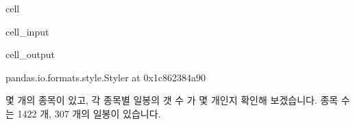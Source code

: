 \documentclass[letterpaper,10pt,english]{jupyterBook}
\begin{document}
\begin{sphinxuseclass}{cell}\begin{sphinxVerbatimInput}

\begin{sphinxuseclass}{cell_input}
\begin{sphinxVerbatim}[commandchars=\\\{\}]
  
\end{sphinxVerbatim}

\end{sphinxuseclass}\end{sphinxVerbatimInput}
\begin{sphinxVerbatimOutput}

\begin{sphinxuseclass}{cell_output}
\begin{sphinxVerbatim}[commandchars=\\\{\}]
\PYGZlt{}pandas.io.formats.style.Styler at 0x1c862384a90\PYGZgt{}
\end{sphinxVerbatim}

\end{sphinxuseclass}\end{sphinxVerbatimOutput}

\end{sphinxuseclass}
\sphinxAtStartPar
 몇 개의 종목이 있고, 각 종목별 일봉의 갯 수 가 몇 개인지 확인해 보겠습니다. 종목 수는 1422 개, 307 개의 일봉이 있습니다.
\end{document}
